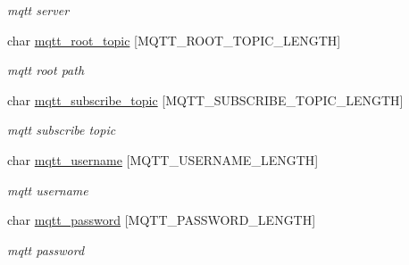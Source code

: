 \begin{DoxyCompactItemize}
\begin{DoxyCompactList}\small\item\em mqtt server \end{DoxyCompactList}\item 
\mbox{\label{structconfiguration__t_acebf92623ad7bdf44f9707b0d99f50da}} 
char \hyperlink{structconfiguration__t_acebf92623ad7bdf44f9707b0d99f50da}{mqtt\+\_\+root\+\_\+topic} \mbox{[}M\+Q\+T\+T\+\_\+\+R\+O\+O\+T\+\_\+\+T\+O\+P\+I\+C\+\_\+\+L\+E\+N\+G\+TH\mbox{]}
\begin{DoxyCompactList}\small\item\em mqtt root path \end{DoxyCompactList}\item 
\mbox{\label{structconfiguration__t_ae3699c4dd6979713472062bbad82c542}} 
char \hyperlink{structconfiguration__t_ae3699c4dd6979713472062bbad82c542}{mqtt\+\_\+subscribe\+\_\+topic} \mbox{[}M\+Q\+T\+T\+\_\+\+S\+U\+B\+S\+C\+R\+I\+B\+E\+\_\+\+T\+O\+P\+I\+C\+\_\+\+L\+E\+N\+G\+TH\mbox{]}
\begin{DoxyCompactList}\small\item\em mqtt subscribe topic \end{DoxyCompactList}\item 
\mbox{\label{structconfiguration__t_ad97d47b585071f095a97296fc3e260e7}} 
char \hyperlink{structconfiguration__t_ad97d47b585071f095a97296fc3e260e7}{mqtt\+\_\+username} \mbox{[}M\+Q\+T\+T\+\_\+\+U\+S\+E\+R\+N\+A\+M\+E\+\_\+\+L\+E\+N\+G\+TH\mbox{]}
\begin{DoxyCompactList}\small\item\em mqtt username \end{DoxyCompactList}\item 
\mbox{\label{structconfiguration__t_af842b7c625c3fdfb1b810e24fc1ba1b8}} 
char \hyperlink{structconfiguration__t_af842b7c625c3fdfb1b810e24fc1ba1b8}{mqtt\+\_\+password} \mbox{[}M\+Q\+T\+T\+\_\+\+P\+A\+S\+S\+W\+O\+R\+D\+\_\+\+L\+E\+N\+G\+TH\mbox{]}
\begin{DoxyCompactList}\small\item\em mqtt password \end{DoxyCompactList}\item 
\mbox{\label{structconfiguration__t_a8de58dc10dfc6b369f34bae82426be5d}} 

\end{DoxyCompactItemize}
